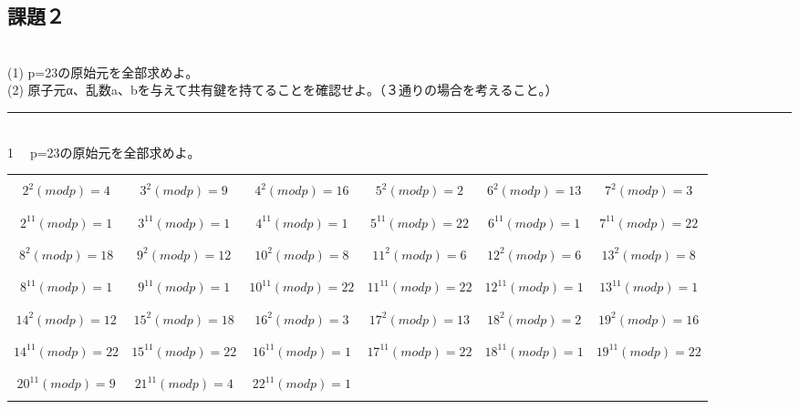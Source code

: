 \documentclass{article}
\begin{document}
\begin{spacing}{1.5}
\section{課題２}\\
(1) p=23の原始元を全部求めよ。\\
(2) 原子元α、乱数a、bを与えて共有鍵を持てることを確認せよ。（３通りの場合を考えること。）\\
\hrule
~\\
\textcircled{1}　p=23の原始元を全部求めよ。\\
\begin{table}[!hbp]
\begin{tabular}{|c|c|c|c|c|c|}
\hline
  &   &   &   &  & \\
$2^2(modp)=4$ & $3^2(modp)=9$ & $4^2(modp)=16$ & $5^2(modp)=2$ & $6^2(modp)=13$ & $7^2(modp)=3$ \\
  &   &   &   &  & \\
\hline
  &   &   &   &  & \\
$2^{11}(modp)=1$ & $3^{11}(modp)=1$ & $4^{11}(modp)=1$ & $5^{11}(modp)=22$ & $6^{11}(modp)=1$ & $7^{11}(modp)=22$ \\
  &   &   &   &  & \\
\hline
\hline
  &   &   &   &  & \\
$8^2(modp)=18$  & $9^2(modp)=12$ & $10^2(modp)=8$ & $11^2(modp)=6$ & $12^2(modp)=6$ & $13^2(modp)=8$\\
 &   &   &   &  & \\
\hline
 &   &   &   &  & \\
$8^{11}(modp)=1$  & $9^{11}(modp)=1$ & $10^{11}(modp)=22$ & $11^{11}(modp)=22$ & $12^{11}(modp)=1$ & $13^{11}(modp)=1$\\
 &   &   &   &  & \\
\hline
\hline
 &   &   &   &  & \\
$14^2(modp)=12$  & $15^2(modp)=18$ & $16^2(modp)=3$ & $17^2(modp)=13$ & $18^2(modp)=2$ & $19^2(modp)=16$\\
 &   &   &   &  & \\
\hline
 &   &   &   &  & \\
$14^{11}(modp)=22$  & $15^{11}(modp)=22$ & $16^{11}(modp)=1$ & $17^{11}(modp)=22$ & $18^{11}(modp)=1$ & $19^{11}(modp)=22$\\
 &   &   &   &  & \\
\hline
\hline
 &   &   &   &  & \\
$20^{11}(modp)=9$  & $21^{11}(modp)=4$ & $22^{11}(modp)=1$ &  &  & \\
&   &   &   &  & \\

\end{tabular}
\end{table}
\end{spacing}
\end{document}
